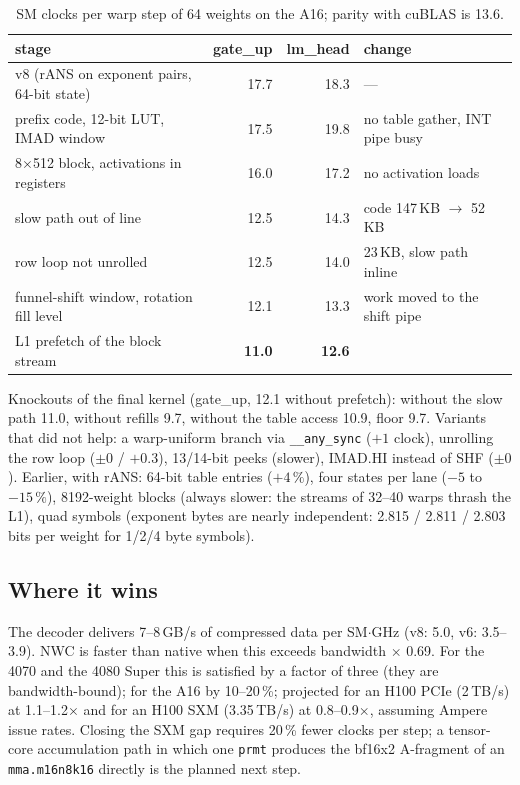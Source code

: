 \documentclass[11pt]{article}
\begin{document}
\begin{table}[h]\centering
\begin{tabular}{lrrl}\toprule
stage & gate\_up & lm\_head & change \\\midrule
v8 (rANS on exponent pairs, 64-bit state) & 17.7 & 18.3 & --- \\
prefix code, 12-bit LUT, IMAD window & 17.5 & 19.8 & no table gather, INT pipe busy \\
8$\times$512 block, activations in registers & 16.0 & 17.2 & no activation loads \\
slow path out of line & 12.5 & 14.3 & code 147\,KB $\rightarrow$ 52\,KB \\
row loop not unrolled & 12.5 & 14.0 & 23\,KB, slow path inline \\
funnel-shift window, rotation fill level & 12.1 & 13.3 & work moved to the shift pipe \\
L1 prefetch of the block stream & \textbf{11.0} & \textbf{12.6} & \\\bottomrule
\end{tabular}
\caption{SM clocks per warp step of 64 weights on the A16; parity with cuBLAS is 13.6.}
\label{tab:stages}
\end{table}

Knockouts of the final kernel (gate\_up, 12.1 without prefetch): without the slow path 11.0, without
refills 9.7, without the table access 10.9, floor 9.7. Variants that did not help: a warp-uniform branch
via \texttt{\_\_any\_sync} ($+1$ clock), unrolling the row loop ($\pm 0$ / $+0.3$), 13/14-bit peeks
(slower), IMAD.HI instead of SHF ($\pm 0$). Earlier, with rANS: 64-bit table entries ($+4\,\%$), four states
per lane ($-5$ to $-15\,\%$), 8192-weight blocks (always slower: the streams of 32--40 warps thrash the
L1), quad symbols (exponent bytes are nearly independent: 2.815 / 2.811 / 2.803 bits per weight for 1/2/4
byte symbols).

\subsection{Where it wins}

The decoder delivers 7--8\,GB/s of compressed data per SM$\cdot$GHz (v8: 5.0, v6: 3.5--3.9). NWC is faster
than native when this exceeds bandwidth $\times$ 0.69. For the 4070 and the 4080 Super this is satisfied by
a factor of three (they are bandwidth-bound); for the A16 by 10--20\,\%; projected for an H100 PCIe
(2\,TB/s) at 1.1--1.2$\times$ and for an H100 SXM (3.35\,TB/s) at 0.8--0.9$\times$, assuming Ampere issue
rates. Closing the SXM gap requires 20\,\% fewer clocks per step; a tensor-core accumulation path in which
one \texttt{prmt} produces the bf16x2 A-fragment of an \texttt{mma.m16n8k16} directly is the planned next
step.
\end{document}
